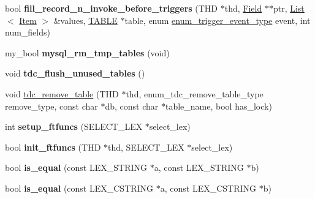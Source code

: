 \begin{DoxyCompactItemize}
\item 
\mbox{\label{group__Data__Dictionary_gaf04201d06a91143d6c13dc72e2ab3aa7}} 
bool {\bfseries fill\+\_\+record\+\_\+n\+\_\+invoke\+\_\+before\+\_\+triggers} (T\+HD $\ast$thd, \mbox{\hyperlink{classField}{Field}} $\ast$$\ast$ptr, \mbox{\hyperlink{classList}{List}}$<$ \mbox{\hyperlink{classItem}{Item}} $>$ \&values, \mbox{\hyperlink{structTABLE}{T\+A\+B\+LE}} $\ast$table, enum \mbox{\hyperlink{trigger__def_8h_a25c92abc3a183d6950b0d9a4ee846e5e}{enum\+\_\+trigger\+\_\+event\+\_\+type}} event, int num\+\_\+fields)
\item 
\mbox{\label{group__Data__Dictionary_gadded8328656d64a663d994979a50b956}} 
my\+\_\+bool {\bfseries mysql\+\_\+rm\+\_\+tmp\+\_\+tables} (void)
\item 
\mbox{\label{group__Data__Dictionary_gaaae1459addd4c75ddbf76468ba9a26a6}} 
void {\bfseries tdc\+\_\+flush\+\_\+unused\+\_\+tables} ()
\item 
void \mbox{\hyperlink{group__Data__Dictionary_ga8faf6c6118b6677394e14994ae614075}{tdc\+\_\+remove\+\_\+table}} (T\+HD $\ast$thd, enum\+\_\+tdc\+\_\+remove\+\_\+table\+\_\+type remove\+\_\+type, const char $\ast$db, const char $\ast$table\+\_\+name, bool has\+\_\+lock)
\item 
\mbox{\label{group__Data__Dictionary_ga481e7e276a23583989ab7fc28bf70928}} 
int {\bfseries setup\+\_\+ftfuncs} (S\+E\+L\+E\+C\+T\+\_\+\+L\+EX $\ast$select\+\_\+lex)
\item 
\mbox{\label{group__Data__Dictionary_ga673bd1c3a18bccbfeeaedccdc1434d8c}} 
bool {\bfseries init\+\_\+ftfuncs} (T\+HD $\ast$thd, S\+E\+L\+E\+C\+T\+\_\+\+L\+EX $\ast$select\+\_\+lex)
\item 
\mbox{\label{group__Data__Dictionary_ga8b26ffd4f5885a763dc68dccf87ae547}} 
bool {\bfseries is\+\_\+equal} (const L\+E\+X\+\_\+\+S\+T\+R\+I\+NG $\ast$a, const L\+E\+X\+\_\+\+S\+T\+R\+I\+NG $\ast$b)
\item 
\mbox{\label{group__Data__Dictionary_ga32e194df2b3923a1b4cf2f2567c829b7}} 
bool {\bfseries is\+\_\+equal} (const L\+E\+X\+\_\+\+C\+S\+T\+R\+I\+NG $\ast$a, const L\+E\+X\+\_\+\+C\+S\+T\+R\+I\+NG $\ast$b)
$$
\end{DoxyCompactItemize}

